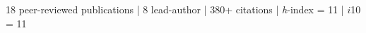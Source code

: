 \documentclass[11pt,a4paper]{article}
\begin{document}



%
\begin{center}
	18 peer-reviewed publications | 8 lead-author | 380+ citations | {\it h}-index = 11 | $i$10 = 11 
\end{center}

\end{document}
